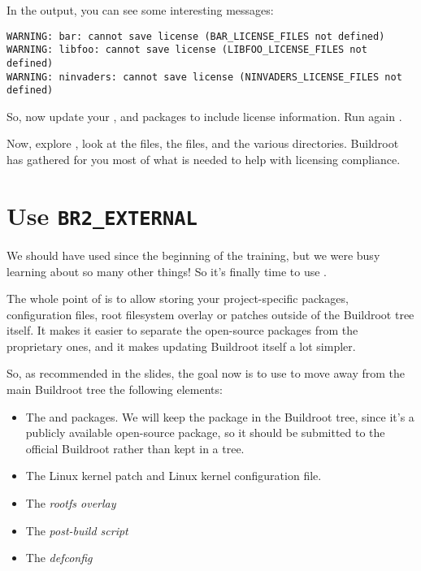 In the output, you can see some interesting messages:

\begin{verbatim}
WARNING: bar: cannot save license (BAR_LICENSE_FILES not defined)
WARNING: libfoo: cannot save license (LIBFOO_LICENSE_FILES not defined)
WARNING: ninvaders: cannot save license (NINVADERS_LICENSE_FILES not defined)
\end{verbatim}

So, now update your ,  and 
packages to include license information. Run again .

Now, explore , look at the  files,
the  files, and the various directories. Buildroot has
gathered for you most of what is needed to help with licensing
compliance.

\section{Use {\tt BR2\_EXTERNAL}}

We should have used  since the beginning of the
training, but we were busy learning about so many other things! So
it's finally time to use .

The whole point of  is to allow storing your
project-specific packages, configuration files, root filesystem
overlay or patches outside of the Buildroot tree itself. It makes it
easier to separate the open-source packages from the proprietary ones,
and it makes updating Buildroot itself a lot simpler.

So, as recommended in the slides, the goal now is to use
 to move away from the main Buildroot tree the
following elements:

\begin{itemize}

\item The  and  packages. We will keep the
   package in the Buildroot tree, since it's a
  publicly available open-source package, so it should be submitted to
  the official Buildroot rather than kept in a 
  tree.

\item The Linux kernel patch and Linux kernel configuration file.

\item The {\em rootfs overlay}

\item The {\em post-build script}

\item The {\em defconfig}

\end{itemize}

